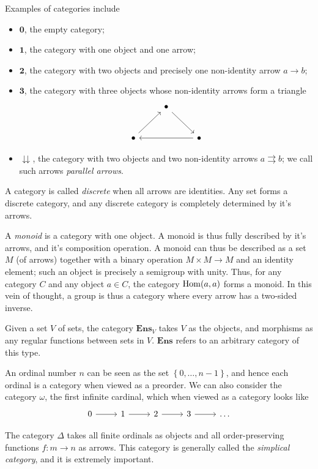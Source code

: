 Examples of categories include
\begin{itemize}
	\item $\mathbf{0} $, the empty category;
	\item $\mathbf{1} $, the category with one object and one arrow;
	\item $\mathbf{2} $, the category with two objects and precisely one non-identity arrow $a\to b$;
	\item $\mathbf{3} $, the category with three objects whose non-identity arrows form a triangle
		\[\begin{tikzcd}[row sep = 2.5em, column sep = 2.5em]
			&\bullet\ar[dr] \\
			\bullet \ar[ur] &&\bullet \ar[ll] 
		\end{tikzcd}\]
	\item $\downdownarrows$, the category with two objects and two non-identity arrows $a\rightrightarrows b$; we call such arrows \emph{parallel arrows}.
\end{itemize}

A category is called \emph{discrete} when all arrows are identities. Any set forms a discrete category, and any discrete category is completely determined by it's arrows.

A \emph{monoid} is a category with one object. A monoid is thus fully described by it's arrows, and it's composition operation. A monoid can thus be described as a set $M$ (of arrows) together with a binary operation $M\times M\to M$ and an identity element; such an object is precisely a semigroup with unity. Thus, for any category $C$ and any object $a\in C$, the category $\operatorname{Hom}(a, a) $ forms a monoid. In this vein of thought, a group is thus a category where every arrow has a two-sided inverse.

Given a set $V$ of sets, the category $\mathbf{Ens}_V$ takes $V$ as the objects, and morphisms as any regular functions between sets in $V$. $\mathbf{Ens} $ refers to an arbitrary category of this type.

An ordinal number $n$ can be seen as the set $\left\{ 0, \ldots , n-1 \right\} $, and hence each ordinal is a category when viewed as a preorder. We can also consider the category $\omega $, the first infinite cardinal, which when viewed as a category looks like
\[\begin{tikzcd}[row sep = 2.5em, column sep = 2.5em]
	0\ar[r] &1\ar[r] &2\ar[r] &3\ar[r] &\ldots 
\end{tikzcd}\]

The category $\Delta $ takes all finite ordinals as objects and all order-preserving functions $f : m \to n$ as arrows. This category is generally called the \emph{simplical category}, and it is extremely important.

